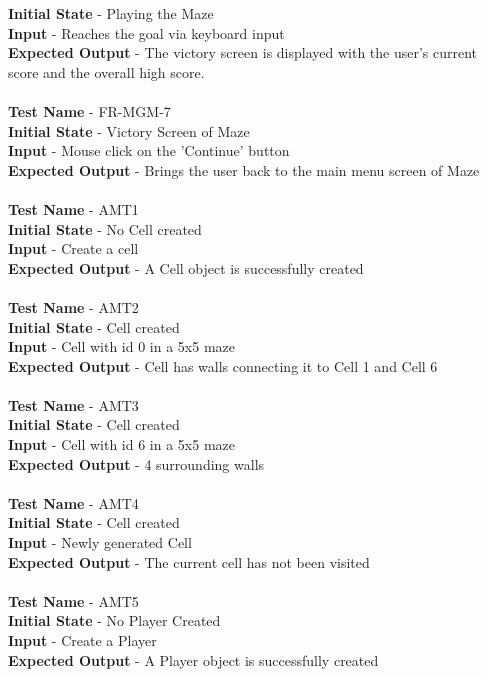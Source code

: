 \documentclass[12pt, titlepage]{article}
\begin{document}
\textbf{Initial State} - Playing the Maze\\
\textbf{Input} - Reaches the goal via keyboard input\\
\textbf{Expected Output} - The victory screen is displayed with the user's current score and the overall high score.\\ \\
\textbf{Test Name} - FR-MGM-7\\
\textbf{Initial State} - Victory Screen of Maze\\
\textbf{Input} - Mouse click on the 'Continue' button\\
\textbf{Expected Output} - Brings the user back to the main menu screen of Maze\\ \\
\textbf{Test Name} - AMT1\\
\textbf{Initial State} - No Cell created\\
\textbf{Input} - Create a cell\\
\textbf{Expected Output} - A Cell object is successfully created\\ \\
\textbf{Test Name} - AMT2\\
\textbf{Initial State} - Cell created\\
\textbf{Input} - Cell with id 0 in a 5x5 maze\\
\textbf{Expected Output} - Cell has walls connecting it to Cell 1 and Cell 6\\ \\
\textbf{Test Name} - AMT3\\
\textbf{Initial State} - Cell created\\
\textbf{Input} - Cell with id 6 in a 5x5 maze\\
\textbf{Expected Output} - 4 surrounding walls\\ \\
\textbf{Test Name} - AMT4\\
\textbf{Initial State} - Cell created\\
\textbf{Input} - Newly generated Cell\\
\textbf{Expected Output} - The current cell has not been visited\\ \\
\textbf{Test Name} - AMT5\\
\textbf{Initial State} - No Player Created\\
\textbf{Input} - Create a Player\\ 
\textbf{Expected Output} - A Player object is successfully created\\ 
\end{document}
